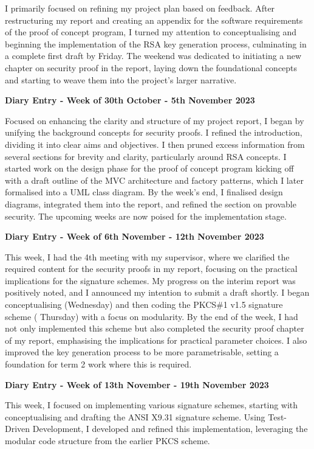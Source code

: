 \documentclass[]{final_report}
\theoremstyle{definition}
\begin{document}
I primarily focused on refining my project plan based on feedback. After restructuring my report and
creating an appendix for the software requirements of the proof of concept program, I turned my
attention to conceptualising and beginning the implementation of the RSA key generation process,
culminating in a complete first draft by Friday. The weekend was dedicated to initiating a new
chapter on security proof in the report, laying down the foundational concepts and starting to weave
them into the project's larger narrative.

\textbf{Diary Entry - Week of 30th October - 5th November 2023}

Focused on enhancing the clarity and structure of my project report, I began by unifying the
background concepts for security proofs. I refined the introduction, dividing it into clear aims and
objectives. I then pruned excess information from several sections for brevity and clarity,
particularly around RSA concepts. I started work on the design phase for the proof of concept
program kicking off with a draft outline of the MVC architecture and factory patterns, which I later
formalised into a UML class diagram. By the week's end, I finalised design diagrams, integrated them
into the report, and refined the section on provable security. The upcoming weeks are now poised for
the implementation stage.

\textbf{Diary Entry - Week of 6th November - 12th November 2023}

This week, I had the 4th meeting with my supervisor, where we clarified the required content for the
security proofs in my report, focusing on the practical implications for the signature schemes. My
progress on the interim report was positively noted, and I announced my intention to submit a draft
shortly. I began conceptualising (Wednesday) and then coding the PKCS\#1 v1.5 signature scheme (
Thursday) with a focus on modularity. By the end of the week, I had not only implemented this scheme
but also completed the security proof chapter of my report, emphasising the implications for
practical parameter choices. I also improved the key generation process to be more parametrisable,
setting a foundation for term 2 work where this is required.

\textbf{Diary Entry - Week of 13th November - 19th November 2023}

This week, I focused on implementing various signature schemes, starting with conceptualising and
drafting the ANSI X9.31 signature scheme. Using Test-Driven Development, I developed and refined
this implementation, leveraging the modular code structure from the earlier PKCS scheme.
\end{document}
